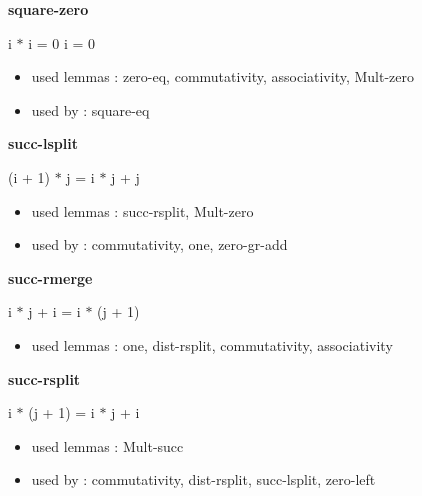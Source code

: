 \documentclass[a4paper]{article}
\begin{document}
\medskip

\bigskip

{\large\bf square-zero}

\medskip

 \Fol i $*$ i = 0 \Equiv i = 0

\begin{itemize}


\item       used lemmas  : zero-eq, commutativity, associativity, Mult-zero
\item       used by      : square-eq

\end{itemize}

\medskip

\bigskip

{\large\bf succ-lsplit}

\medskip

 \Fol (i + 1) $*$ j = i $*$ j + j

\begin{itemize}


\item       used lemmas  : succ-rsplit, Mult-zero
\item       used by      : commutativity, one, zero-gr-add

\end{itemize}

\medskip

\bigskip

{\large\bf succ-rmerge}

\medskip

 \Fol i $*$ j + i = i $*$ (j + 1)

\begin{itemize}


\item       used lemmas  : one, dist-rsplit, commutativity, associativity

\end{itemize}

\medskip

\bigskip

{\large\bf succ-rsplit}

\medskip

 \Fol i $*$ (j + 1) = i $*$ j + i

\begin{itemize}


\item       used lemmas  : Mult-succ
\item       used by      : commutativity, dist-rsplit, succ-lsplit, zero-left

\end{itemize}
\end{document}
